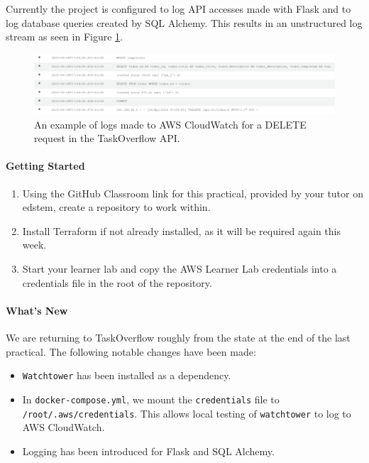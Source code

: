 \documentclass{csse4400}
\begin{document}
Currently the project is configured to log API accesses made with Flask and to log database queries created by SQL Alchemy.
This results in an unstructured log stream as seen in Figure \ref{fig:cloud-logs}.

\begin{figure}[ht]
    \centering
    \begin{adjustwidth}{-7.5mm}{-7.5mm}
        \includegraphics[width=0.95\paperwidth]{images/cloud-watch-log}
    \end{adjustwidth}
    \caption{An example of logs made to AWS CloudWatch for a DELETE request in the TaskOverflow API.}
    \label{fig:cloud-logs}
\end{figure}

\paragraph{Getting Started}
\begin{enumerate}
    \item Using the GitHub Classroom link for this practical, provided by your tutor on edstem, create a repository to work within.
    \item Install Terraform if not already installed, as it will be required again this week.
    \item Start your learner lab and copy the AWS Learner Lab credentials into a credentials file in the root of the repository.
\end{enumerate}

\paragraph{What's New}
We are returning to TaskOverflow roughly from the state at the end of the last practical.
The following notable changes have been made:
\begin{itemize}
    \item \texttt{Watchtower} has been installed as a dependency.
    \item In \texttt{docker-compose.yml}, we mount the \texttt{credentials} file to \texttt{/root/.aws/credentials}.
        This allows local testing of \texttt{watchtower} to log to AWS CloudWatch.
    \item Logging has been introduced for Flask and SQL Alchemy.
\end{itemize}
\end{document}
